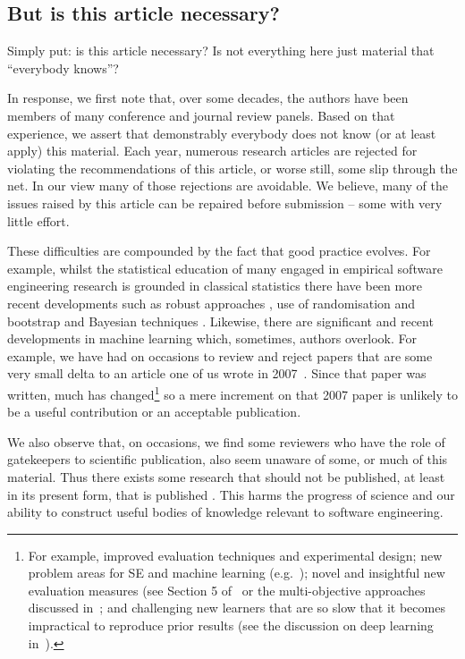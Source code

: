 \documentclass[10pt]{elsarticle}
\begin{document}
\subsection{But is this article necessary?}
Simply put: is this article necessary? Is not everything here just material that ``everybody knows''?

In response, we first note that, over some decades, the authors have been members of many conference and journal review panels. Based on that experience, we assert that demonstrably everybody does not know (or at least apply) this material.  Each year, numerous research articles are rejected for violating the recommendations of this article, or worse still, some slip through the net.  In our view many of those rejections are avoidable. We believe, many of the issues raised by this article can be repaired before submission -- some with very little effort.

These difficulties are compounded by the fact that good practice evolves.  For example, whilst the statistical education of many engaged in empirical software engineering research is grounded in classical statistics there have been more recent developments such as robust approaches \cite{Kitc17}, use of randomisation and bootstrap \cite{Carp00} and Bayesian techniques \cite{Gelm13}.  Likewise, there are significant and recent developments in machine learning which, sometimes, authors overlook. For example, we have had on occasions to review and reject papers that are some very small delta to an article one of us wrote in 2007~\cite{menzies07}. Since that paper was written, much has changed\footnote{For example, improved evaluation techniques and experimental design; new problem areas for SE and machine learning (e.g.~\cite{sarkar2015cost});
 novel and insightful new evaluation measures (see Section 5 of~\cite{huang2017supervised} or the multi-objective approaches discussed in~\cite{nair2018data}; and challenging new learners that are so slow that it becomes impractical to reproduce prior results (see the discussion on deep learning in~\cite{fu2017easy}).} so a mere increment on that 2007 paper is unlikely to be a useful contribution or an acceptable publication. 

We also observe that, on occasions, we find some reviewers who have the role of gatekeepers to scientific publication, also seem unaware of some, or much of this material.  Thus there exists some research that should not be published, at least in its present form, that is published \cite{Kitc02,Jorg16}.  This harms the progress of science and our ability to construct useful bodies of knowledge relevant to software engineering.
 
\end{document}
